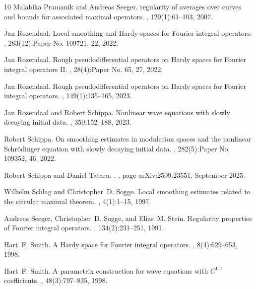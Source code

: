 \documentclass{amsart}
\numberwithin{equation}{section}
\theoremstyle{definition}
\begin{document}
\begin{thebibliography}{10}
Malabika Pramanik and Andreas Seeger.
 regularity of averages over curves and bounds for associated
  maximal operators.
, 129(1):61--103, 2007.

Jan Rozendaal.
\newblock Local smoothing and {H}ardy spaces for {F}ourier integral operators.
, 283(12):Paper No. 109721, 22, 2022.

Jan Rozendaal.
\newblock Rough pseudodifferential operators on {H}ardy spaces for {F}ourier
  integral operators {II}.
, 28(4):Paper No. 65, 27, 2022.

Jan Rozendaal.
\newblock Rough pseudodifferential operators on {H}ardy spaces for {F}ourier
  integral operators.
, 149(1):135--165, 2023.

Jan Rozendaal and Robert Schippa.
\newblock Nonlinear wave equations with slowly decaying initial data.
, 350:152--188, 2023.

Robert Schippa.
\newblock On smoothing estimates in modulation spaces and the nonlinear
  {S}chr\"{o}dinger equation with slowly decaying initial data.
, 282(5):Paper No. 109352, 46, 2022.

Robert {Schippa} and Daniel {Tataru}.
.
, page arXiv:2509.23551, September 2025.

Wilhelm Schlag and Christopher~D. Sogge.
\newblock Local smoothing estimates related to the circular maximal theorem.
, 4(1):1--15, 1997.

Andreas Seeger, Christopher~D. Sogge, and Elias~M. Stein.
\newblock Regularity properties of {F}ourier integral operators.
, 134(2):231--251, 1991.

Hart~F. Smith.
\newblock A {H}ardy space for {F}ourier integral operators.
, 8(4):629--653, 1998.

Hart~F. Smith.
\newblock A parametrix construction for wave equations with {$C^{1,1}$}
  coefficients.
, 48(3):797--835, 1998.


\end{thebibliography}
\end{document}
